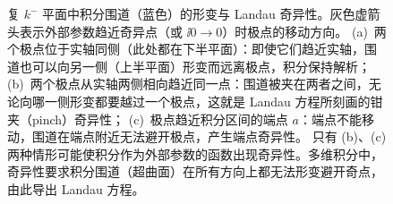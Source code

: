 \begin{figure}[htbp]
\caption{复 $k^-$ 平面中积分围道（蓝色）的形变与 Landau 奇异性。灰色虚箭头表示外部参数趋近奇异点（或 $\ii0\to0$）时极点的移动方向。
(a)~两个极点位于实轴同侧（此处都在下半平面）：即使它们趋近实轴，围道也可以向另一侧（上半平面）形变而远离极点，积分保持解析；
(b)~两个极点从实轴两侧相向趋近同一点：围道被夹在两者之间，无论向哪一侧形变都要越过一个极点，这就是 Landau 方程所刻画的钳夹（pinch）奇异性；
(c)~极点趋近积分区间的端点 $a$：端点不能移动，围道在端点附近无法避开极点，产生端点奇异性。
只有 (b)、(c) 两种情形可能使积分作为外部参数的函数出现奇异性。多维积分中，奇异性要求积分围道（超曲面）在所有方向上都无法形变避开奇点，由此导出 Landau 方程。}
\label{fig:landau-pinch}
\end{figure}


